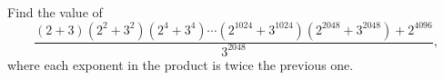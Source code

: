 Find the value of
\[
\dfrac{(2+3)\left(2^2+3^2\right)\left(2^4+3^4\right)\cdots\left(2^{1024}+3^{1024}\right)\left(2^{2048}+3^{2048}\right)+2^{4096}}{3^{2048}},
\]
where each exponent in the product is twice the previous one.
